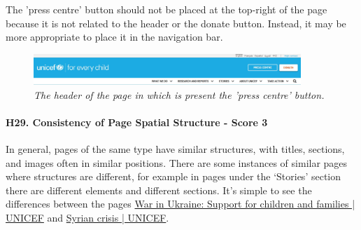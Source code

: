 \newline The 'press centre' button should not be placed at the top-right of the page because it is not related to the header or the donate button. Instead, it may be more appropriate to place it in the navigation bar.
\begin{figure}[h]
	\begin{center}
		\includegraphics[width=0.9\textwidth]{FinalScores32.jpg}
		\captionsetup{font=small}
		\caption{\textit{The header of the page in which is present the 'press centre' button.}}
	\end{center}
\end{figure}
\newline
\newline \paragraph{H29. Consistency of Page Spatial Structure - Score 3} \label{subsec:H29}	In general, pages of the same type have similar structures, with titles, sections, and images often in similar positions. There are some instances of similar pages where structures are different, for example in pages under the ‘Stories’ section there are different elements and different sections.
\newline It’s simple to see the differences between the pages \href{https://www.unicef.org/emergencies/war-ukraine-pose-immediate-threat-children}{War in Ukraine: Support for children and families | UNICEF} and \href{https://www.unicef.org/emergencies/syrian-crisis}{Syrian crisis | UNICEF}.




















